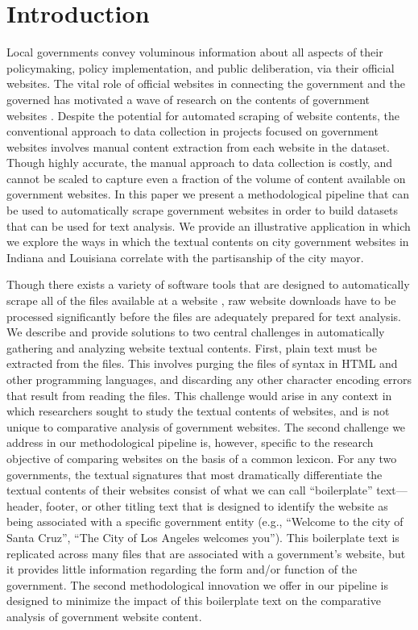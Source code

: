\documentclass[11pt]{article}
\begin{document}
\section{Introduction}

Local governments convey voluminous information about all aspects of their policymaking, policy implementation, and public deliberation, via their official websites. The vital role of official websites in connecting the government and the governed has motivated a wave of research on the contents of government websites \citep[e.g., ][]{grimmelikhuijsen2010transparency,wang2005evaluating,osman2014cobra}. Despite the potential for automated scraping of website contents, the conventional approach to data collection in projects focused on government websites involves manual content extraction from each website in the dataset. Though highly accurate, the manual approach to data collection is costly, and cannot be scaled to capture even a fraction of the volume of content available on government websites. In this paper we present a methodological pipeline that can be used to automatically scrape government websites in order to build datasets that can be used for text analysis. We provide an illustrative application in which we explore the ways in which the textual contents on city government websites in Indiana and Louisiana correlate with the partisanship of the city mayor.

Though there exists a variety of software tools that are designed to automatically scrape all of the files available at a website \citep{glez2013web}, raw website downloads have to be processed significantly before the files are adequately prepared for text analysis. We describe and provide solutions to two central challenges in automatically gathering and analyzing website textual contents. First, plain text must be extracted from the files. This involves purging the files of syntax in HTML and other programming languages, and discarding any other character encoding errors that result from reading the files. This challenge would arise in any context in which researchers sought to study the textual contents of websites, and is not unique to comparative analysis of government websites. The second challenge we address in our methodological pipeline is, however, specific to the research objective of comparing websites on the basis of a common lexicon. For any two governments, the textual signatures that most dramatically differentiate the textual contents of their websites consist of what we can call ``boilerplate'' text---header, footer, or other titling text that is designed to identify the website as being associated with a specific government entity (e.g., ``Welcome to the city of Santa Cruz'', ``The City of Los Angeles welcomes you''). This boilerplate text is replicated across many files that are associated with a government's website, but it provides little information regarding the form and/or function of the government. The second methodological innovation we offer in our pipeline is designed to minimize the impact of this boilerplate text on the comparative analysis of government website content. 
\end{document}
